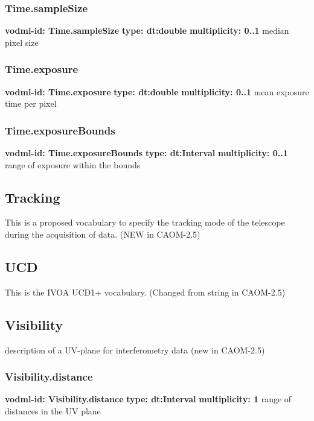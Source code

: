     \subsubsection{Time.sampleSize}
      \textbf{vodml-id: Time.sampleSize} \newline
      \textbf{type: dt:double} \newline
      \textbf{multiplicity: 0..1} \newline
      median pixel size

    \subsubsection{Time.exposure}
      \textbf{vodml-id: Time.exposure} \newline
      \textbf{type: dt:double} \newline
      \textbf{multiplicity: 0..1} \newline
      mean exposure time per pixel

    \subsubsection{Time.exposureBounds}
      \textbf{vodml-id: Time.exposureBounds} \newline
      \textbf{type: dt:Interval} \newline
      \textbf{multiplicity: 0..1} \newline
      range of exposure within the bounds

  \subsection{Tracking}
  \label{sect:Tracking}
    This is a proposed vocabulary to specify the tracking mode of the telescope during the acquisition of data. (NEW in CAOM-2.5)

  \subsection{UCD}
  \label{sect:UCD}
    This is the IVOA UCD1+ vocabulary. (Changed from string in CAOM-2.5)

  \subsection{Visibility}
  \label{sect:Visibility}
    description of a UV-plane for interferometry data (new in CAOM-2.5)

    \subsubsection{Visibility.distance}
      \textbf{vodml-id: Visibility.distance} \newline
      \textbf{type: dt:Interval} \newline
      \textbf{multiplicity: 1} \newline
      range of distances in the UV plane

